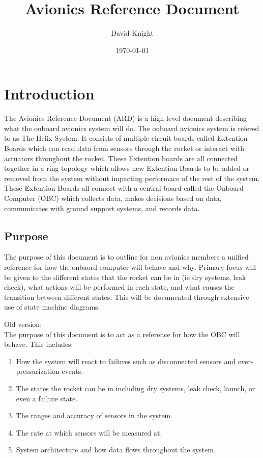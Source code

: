 \documentclass{article}
\title{Avionics Reference Document}
\author{David Knight}
\date{\today}
\newcommand{\+}{}
\begin{document}
\maketitle
{}
\newpage
\tableofcontents
{}
\newpage
\listoftables
\newpage
\listoffigures
\newpage

\section{Introduction}
The Avionics Reference Document (ARD) is a high level document describing what the onboard avionics system will do. The onboard avionics system is refered to as The Helix System. It consists of multiple circuit boards called Extention Boards which can read data from sensors through the rocket or interact with actuators throughout the rocket. These Extention boards are all connected together in a ring topology which allows new Extention Boards to be added or removed from the system without impacting performace of the rest of the system. These Extention Boards all connect with a central board called the Onboard Computer (OBC) which collects data, makes decisions based on data, communicates with ground support systems, and records data.

\subsection{Purpose}
The purpose of this document is to outline for non avionics members a unified reference for how the onbaord computer will behave and why. Primary focus will be given to the different states that the rocket can be in (ie dry systems, leak check), what actions will be performed in each state, and what causes the transition between different states. This will be documented through extensive use of state machine diagrams.

Old version:\\
The purpose of this document is to act as a reference for how the OBC will behave. This includes:
\begin{enumerate}
    \item How the system will react to failures such as disconnected sensors and over-pressurization events. 
    \item The states the rocket can be in including dry systems, leak check, launch, or even a failure state.
    \item The ranges and accuracy of sensors in the system.
    \item The rate at which sensors will be measured at.
    \item System architecture and how data flows throughout the system.
\end{enumerate}
\end{document}
